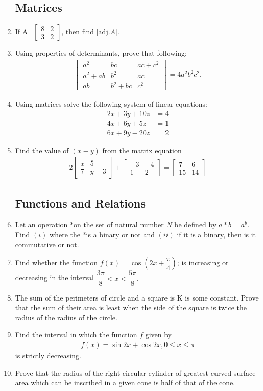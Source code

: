\documentclass[12pt,-letter paper]{article}
\providecommand{\mydet}[1]{\ensuremath{\begin{vmatrix}#1\end{vmatrix}}}
\providecommand{\myvec}[1]{\ensuremath{\begin{bmatrix}#1\end{bmatrix}}}
\providecommand{\brak}[1]{\ensuremath{\left(#1\right)}}
\providecommand{\abs}[1]{\left\vert#1\right\vert}
\begin{document}
\begin{enumerate}
\subsection*{ Matrices}
\item If A=$\myvec{8&2\\3&2}$, then find $\abs{\text{adj}
.A}$.
\item Using properties of determinants, prove that following:
\begin{align*}
\mydet{a^2&bc&ac+c^2\\a^2+ab&b^2&ac\\ab&b^2+bc&c^2}=4a^2b^2c^2.
\end{align*}                                                   
\item Using matrices solve the following system of linear equations:
	\begin{align*}
		    2x+3y+10z&=4\\4x+6y+5z&=1\\6x+9y-20z&=2
	\end{align*}       
\item Find the value of $\brak{x-y}$ from the matrix equation 
	\begin{align*}
		2\myvec{x & 5\\7 & y-3}+\myvec{-3 & -4\\1 & 2}=\myvec{7 & 6\\15 & 14}
	\end{align*}
\subsection*{Functions and Relations}
\item Let an operation *on the set of natural number $N$ be defined by $a*b=a^b$. Find $\brak{i}$ where the *is a binary or not and $\brak{ii}$ if it is a binary, then is it commutative or not. 
\item Find whether the function $f\brak{x}=\cos\brak{2x+\dfrac{\pi}{4}}$; is increasing or decreasing in the interval $\dfrac{3\pi}{8}<x<\dfrac{5\pi}{8}.$  
\item The sum of the perimeters of circle and a square is K is some constant. Prove that the sum of their area is least when the side of the square is twice the radius of the radius of the circle.  
\item Find the interval in which the function $f$ given by \begin{align*}
f\brak{x}=\sin2x+\cos2x, 0\leq x\leq \pi \end{align*} is strictly decreasing. 
\item Prove that the radius of the right circular cylinder of greatest curved surface area which can be inscribed in a given cone is half of that of the cone.

\end{enumerate}
\end{document}
